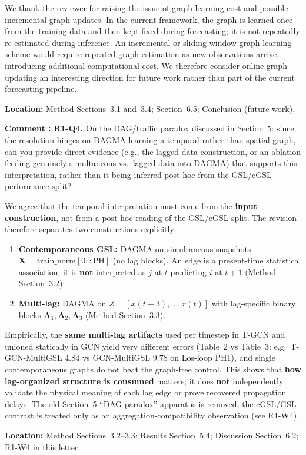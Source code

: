 \documentclass[a4paper,11pt]{article}
\newcounter{commentcounter}
\newcommand{\reviewercomment}[1]{%
    \stepcounter{commentcounter}%
    \begin{reviewerscomment}
        \textbf{Comment \arabic{commentcounter}:} #1
    \end{reviewerscomment}
}
\newcommand{\response}[1]{%
    \begin{myresponse}
        #1
    \end{myresponse}
    \vspace{5mm}
}
\begin{document}
\response{
We thank the reviewer for raising the issue of graph-learning cost and possible incremental graph updates. In the current framework, the graph is learned once from the training data and then kept fixed during forecasting; it is not repeatedly re-estimated during inference. An incremental or sliding-window graph-learning scheme would require repeated graph estimation as new observations arrive, introducing additional computational cost. We therefore consider online graph updating an interesting direction for future work rather than part of the current forecasting pipeline.

\textbf{Location:} Method Sections~3.1 and~3.4; Section~6.5; Conclusion (future work).
}

\reviewercomment{
\textbf{R1-Q4.} On the DAG/traffic paradox discussed in Section~5: since the resolution hinges on DAGMA learning a temporal rather than spatial graph, can you provide direct evidence (e.g., the lagged data construction, or an ablation feeding genuinely simultaneous vs.\ lagged data into DAGMA) that supports this interpretation, rather than it being inferred post hoc from the GSL/cGSL performance split?
}

\response{
We agree that the temporal interpretation must come from the \textbf{input construction}, not from a post-hoc reading of the GSL/cGSL split. The revision therefore separates two constructions explicitly:

\begin{enumerate}
    \item \textbf{Contemporaneous GSL:} DAGMA on simultaneous snapshots $\mathbf{X}=\mathrm{train\_norm}[0::\mathrm{PH}]$ (no lag blocks). An edge is a present-time statistical association; it is \textbf{not} interpreted as $j$ at $t$ predicting $i$ at $t+1$ (Method Section~3.2).
    \item \textbf{Multi-lag:} DAGMA on $Z=[x(t-3),\ldots,x(t)]$ with lag-specific binary blocks $\mathbf{A}_1,\mathbf{A}_2,\mathbf{A}_3$ (Method Section~3.3).
\end{enumerate}

Empirically, the \textbf{same multi-lag artifacts} used per timestep in T-GCN and unioned statically in GCN yield very different errors (Table~2 vs Table~3: e.g.\ T-GCN-MultiGSL $4.84$ vs GCN-MultiGSL $9.78$ on Los-loop PH1), and single contemporaneous graphs do not beat the graph-free control. This shows that \textbf{how lag-organized structure is consumed} matters; it does \textbf{not} independently validate the physical meaning of each lag edge or prove recovered propagation delays. The old Section~5 ``DAG paradox'' apparatus is removed; the cGSL/GSL contrast is treated only as an aggregation-compatibility observation (see R1-W4).

\textbf{Location:} Method Sections~3.2--3.3; Results Section~5.4; Discussion Section~6.2; R1-W4 in this letter.
}
\end{document}
